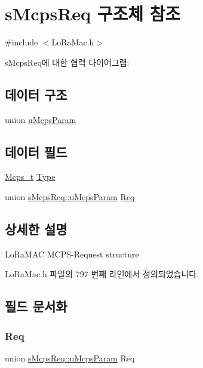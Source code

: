 \hypertarget{structs_mcps_req}{}\section{s\+Mcps\+Req 구조체 참조}
\label{structs_mcps_req}


{\ttfamily \#include $<$Lo\+Ra\+Mac.\+h$>$}



s\+Mcps\+Req에 대한 협력 다이어그램\+:
\subsection*{데이터 구조}
\begin{DoxyCompactItemize}
\item 
union \mbox{\hyperlink{unions_mcps_req_1_1u_mcps_param}{u\+Mcps\+Param}}
\end{DoxyCompactItemize}
\subsection*{데이터 필드}
\begin{DoxyCompactItemize}
\item 
\mbox{\hyperlink{group___l_o_r_a_m_a_c_ga670d0c87a52aeb13391f303a4cf94f00}{Mcps\+\_\+t}} \mbox{\hyperlink{structs_mcps_req_a29993a5d65888bf0f36ec406896bb540}{Type}}
\item 
union \mbox{\hyperlink{unions_mcps_req_1_1u_mcps_param}{s\+Mcps\+Req\+::u\+Mcps\+Param}} \mbox{\hyperlink{structs_mcps_req_ae97f4a2d64d47abdc1715093e4b27373}{Req}}
\end{DoxyCompactItemize}


\subsection{상세한 설명}
Lo\+Ra\+M\+AC M\+C\+P\+S-\/\+Request structure 

Lo\+Ra\+Mac.\+h 파일의 797 번째 라인에서 정의되었습니다.



\subsection{필드 문서화}
\mbox{\label{structs_mcps_req_ae97f4a2d64d47abdc1715093e4b27373}} 
\subsubsection{\texorpdfstring{Req}{Req}}
{\footnotesize\ttfamily union \mbox{\hyperlink{unions_mcps_req_1_1u_mcps_param}{s\+Mcps\+Req\+::u\+Mcps\+Param}} Req}

